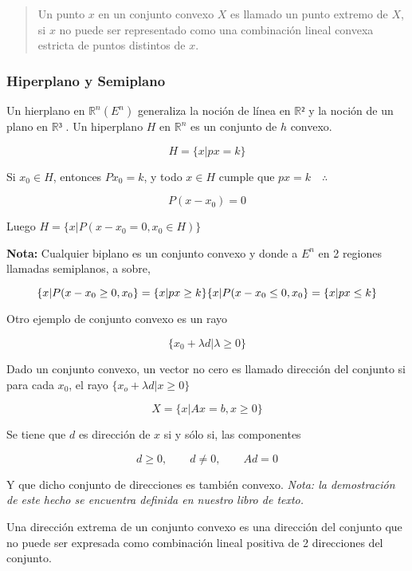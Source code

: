 \documentclass[]{article}
\begin{document}
\begin{quote}
Un punto \(x\) en un conjunto convexo \(X\) es llamado un punto extremo
de \(X\), si \(x\) no puede ser representado como una combinación lineal
convexa estricta de puntos distintos de \(x\).
\end{quote}

\hypertarget{hiperplano-y-semiplano}{%
\subsubsection{Hiperplano y Semiplano}\label{hiperplano-y-semiplano}}

Un hierplano en \(\mathbb R^n(E^n)\) generaliza la noción de línea en
\(\mathbb R²\) y la noción de un plano en \(\mathbb R³\) . Un hiperplano
\(H\) en \(\mathbb R^n\) es un conjunto de \(h\) convexo.

\[H=\{x|px = k\}\]

Si \(x_0 \in H\), entonces \(Px_0=k\), y todo \(x\in H\) cumple que
\(px=k \quad \therefore\)

\[P(x-x_0)= 0\]

Luego \(H = \{x | P(x-x_0 = 0, x_0 \in H)\}\)

\textbf{Nota:} Cualquier biplano es un conjunto convexo y donde a
\(\mathit E^n\) en 2 regiones llamadas semiplanos, a sobre,

\[\{x | P(x-x_0 \ge 0, x_0 \} = \{x| px \ge k\}\\
\{x | P(x-x_0 \le 0, x_0 \} = \{x| px \le k\}\]

Otro ejemplo de conjunto convexo es un rayo

\[\{x_0 + \lambda d | \lambda \ge 0\}\]

Dado un conjunto convexo, un vector no cero es llamado dirección del
conjunto si para cada \(x_0\), el rayo \(\{x_o + \lambda d | x \ge 0\}\)

\[X=\{x | Ax = b, x\ge 0\}\]

Se tiene que \(d\) es dirección de \(x\) si y sólo si, las componentes

\[d\ge0,\qquad d\not=0, \qquad Ad=0\]

Y que dicho conjunto de direcciones es también convexo. \emph{Nota: la
demostración de este hecho se encuentra definida en nuestro libro de
texto.}

Una dirección extrema de un conjunto convexo es una dirección del
conjunto que no puede ser expresada como combinación lineal positiva de
2 direcciones del conjunto.
\end{document}
